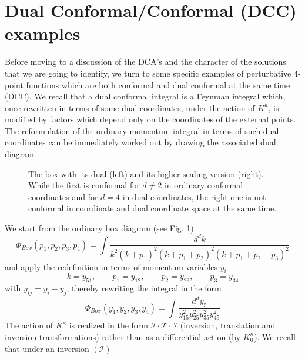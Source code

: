 \documentclass[a4paper,11pt,openright,twoside]{book}
\numberwithin{equation}{section}
\begin{document}
{\section{Dual Conformal/Conformal (DCC) examples}
\label{dccsection}
Before moving to a discussion of the DCA's and the character of the solutions that we are going to identify, we turn to some specific examples of perturbative 4-point functions which are both conformal and dual conformal at the same time (DCC). We recall that a dual conformal integral \cite{Drummond:2006rz,Drummond:2007aua,Drummond:2008vq} is a Feynman integral which, once rewritten in terms of some dual coordinates, under the action of $K^\kappa$, is modified by factors which depend only on the coordinates of the external points. The reformulation of the ordinary momentum integral in terms of such dual coordinates can be immediately worked out by drawing the associated dual diagram. 
\begin{figure}[t]
	\centering
	 \hspace{2cm}
	\caption{The box with its dual (left) and its higher scaling version (right). While the first is conformal for $d\ne2$ in ordinary conformal coordinates and for $d=4$ in dual coordinates, the right one is not conformal in coordinate and dual coordinate space at the same time. \label{Fig1}}
\end{figure}
We start from the ordinary box diagram (see Fig. \ref{Fig1})
\begin{equation}
	\Phi_{Box}(p_1,p_2,p_3,p_4)=\int \frac{d^d k}{k^2 (k + p_1)^2 (k + p_1 + p_2)^2 ( k + p_1 + p_2 + p_3)^2}
\end{equation}
and apply the redefinition in terms of momentum variables $y_i$
\begin{equation}
	k=y_{51}, \qquad p_1=y_{12}, \qquad p_2=y_{23},\qquad p_3=y_{34}
\end{equation}
with $y_{ij}=y_i-y_j$, thereby rewriting the integral in the form 
\begin{equation}
	\label{box1}
	\Phi_{Box}(y_1,y_2,y_3,y_4)=\int \frac{d^d y_5}{y_{15}^2 y_{25}^2 y_{35}^2 y_{45}^2}
\end{equation}
The action of $K^\kappa$ is realized in the form $\mathcal{I} \cdot \mathcal{T}\cdot \mathcal{I}$ (inversion, translation and inversion transformations) rather than as a differential action (by $K_0^\kappa$). We recall that under an inversion $(\mathcal{I})$ 
\begin{equation}

\end{equation}}
\end{document}
